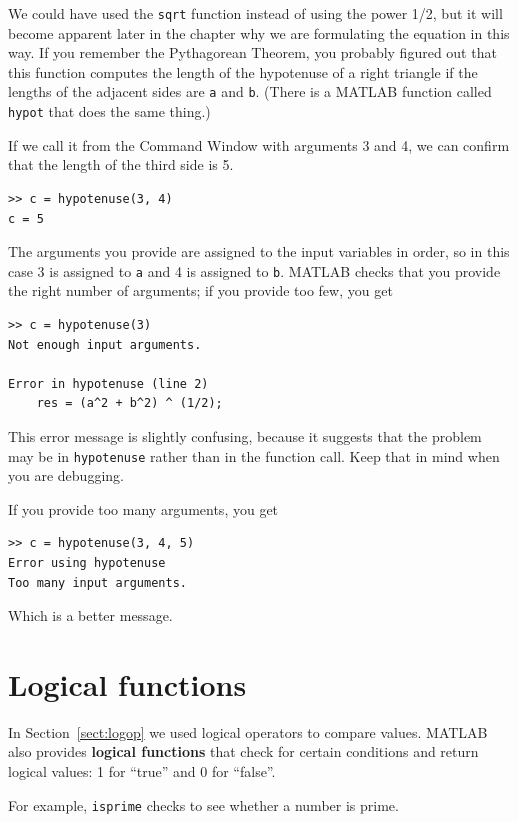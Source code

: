 \documentclass[
]{book}
\begin{document}
We could have used the {\tt sqrt} function instead of using the power 1/2, 
but it will become apparent later in the chapter why we are formulating
the equation in this way.  
If you remember the Pythagorean Theorem, you probably figured out
that this function computes the length of the hypotenuse of a right
triangle if the lengths of the adjacent sides are {\tt a}
and {\tt b}.  (There is a MATLAB function called {\tt hypot} that does
the same thing.)

If we call it from the Command Window with arguments 3 and 4, we can
confirm that the length of the third side is 5.

\begin{verbatim}
>> c = hypotenuse(3, 4)
c = 5
\end{verbatim}

The arguments you provide are assigned to the input variables in
order, so in this case 3 is assigned to {\tt a} and 4 is assigned to
{\tt b}.  MATLAB checks that you provide the right number of arguments;
if you provide too few, you get

\begin{verbatim}
>> c = hypotenuse(3)
Not enough input arguments.

Error in hypotenuse (line 2)
    res = (a^2 + b^2) ^ (1/2);
\end{verbatim}

This error message is slightly confusing, because it suggests that
the problem may be in {\tt hypotenuse} rather than in the function call.
Keep that in mind when you are debugging.

If you provide too many arguments, you get

\begin{verbatim}
>> c = hypotenuse(3, 4, 5)
Error using hypotenuse
Too many input arguments.
\end{verbatim}

Which is a better message.


\section{Logical functions}

In Section~\ref{sect:logop} we used logical operators to compare values.
MATLAB also provides {\bf logical functions} that check for certain
conditions and return logical values: 1 for ``true'' and 0 for ``false''.

For example, {\tt isprime} checks to see whether a number is prime.
\end{document}

